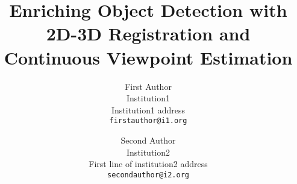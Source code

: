 \documentclass[10pt,twocolumn,letterpaper]{article}
\begin{document}
\title{Enriching Object Detection with 2D-3D Registration and Continuous Viewpoint Estimation}

\author{First Author\\
Institution1\\
Institution1 address\\
{\tt\small firstauthor@i1.org}
\and
Second Author\\
Institution2\\
First line of institution2 address\\
{\tt\small secondauthor@i2.org}
}

\maketitle
\end{document}
